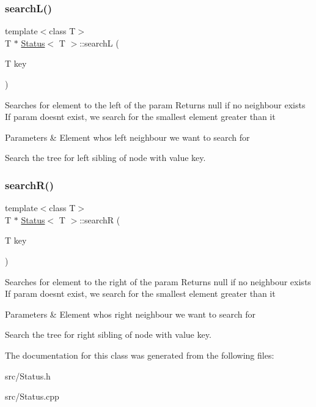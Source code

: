 \subsubsection{\texorpdfstring{search\+L()}{searchL()}}
{\footnotesize\ttfamily template$<$class T$>$ \\
T $\ast$ \hyperlink{classStatus}{Status}$<$ T $>$\+::searchL (\begin{DoxyParamCaption}\item[{T}]{key }\end{DoxyParamCaption})}

Searches for element to the left of the param Returns null if no neighbour exists If param doesnt exist, we search for the smallest element greater than it 
\begin{DoxyParams}{Parameters}
{\em } & Element who\textquotesingle{}s left neighbour we want to search for\\
\hline
\end{DoxyParams}
Search the tree for left sibling of node with value key. \mbox{\label{classStatus_a8db67cdc477f8f55b5c16678b2ec27f0}} 
\subsubsection{\texorpdfstring{search\+R()}{searchR()}}
{\footnotesize\ttfamily template$<$class T$>$ \\
T $\ast$ \hyperlink{classStatus}{Status}$<$ T $>$\+::searchR (\begin{DoxyParamCaption}\item[{T}]{key }\end{DoxyParamCaption})}

Searches for element to the right of the param Returns null if no neighbour exists If param doesnt exist, we search for the smallest element greater than it 
\begin{DoxyParams}{Parameters}
{\em } & Element who\textquotesingle{}s right neighbour we want to search for\\
\hline
\end{DoxyParams}
Search the tree for right sibling of node with value key. 

The documentation for this class was generated from the following files\+:\begin{DoxyCompactItemize}
\item 
src/Status.\+h\item 
src/Status.\+cpp\end{DoxyCompactItemize}
